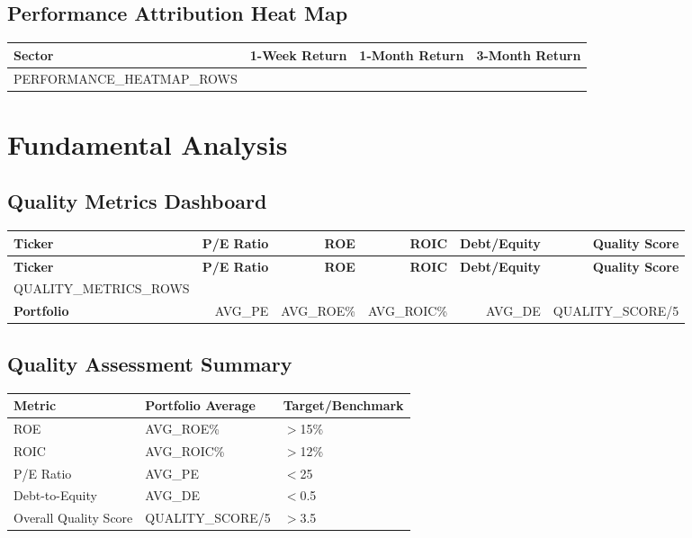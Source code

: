 \documentclass[11pt]{article}
\renewcommand{\arraystretch}{1.3}
\begin{document}
\subsection{Performance Attribution Heat Map}
\renewcommand{\arraystretch}{1.3}
\begin{tabularx}{\textwidth}{|X|>{\raggedleft\arraybackslash}X|>{\raggedleft\arraybackslash}X|>{\raggedleft\arraybackslash}X|}
\hline
\rowcolor{bearish!15}
\textbf{Sector} & \textbf{1-Week Return} & \textbf{1-Month Return} & \textbf{3-Month Return} \\
\hline
{{PERFORMANCE_HEATMAP_ROWS}}
\hline
\end{tabularx}

\section{Fundamental Analysis}

\subsection{Quality Metrics Dashboard}

\renewcommand{\arraystretch}{1.2}
\small  %
\begin{longtable}{|l|r|r|r|r|r|}
\hline
\rowcolor{primary!15}
\textbf{Ticker} & \textbf{P/E Ratio} & \textbf{ROE} & \textbf{ROIC} & \textbf{Debt/Equity} & \textbf{Quality Score} \\
\hline
\endfirsthead
\hline
\rowcolor{primary!15}
\textbf{Ticker} & \textbf{P/E Ratio} & \textbf{ROE} & \textbf{ROIC} & \textbf{Debt/Equity} & \textbf{Quality Score} \\
\hline
\endhead
{{QUALITY_METRICS_ROWS}}
\hline
\multicolumn{6}{|c|}{\textbf{Portfolio Weighted Averages}} \\
\hline
\textbf{Portfolio} & {{AVG_PE}} & {{AVG_ROE}}\% & {{AVG_ROIC}}\% & {{AVG_DE}} & {{QUALITY_SCORE}}/5 \\
\hline
\end{longtable}
\normalsize  %

\subsection{Quality Assessment Summary}

\begin{center}
\begin{tabularx}{\textwidth}{|X|X|X|}
\hline
\rowcolor{primary!20}
\textbf{Metric} & \textbf{Portfolio Average} & \textbf{Target/Benchmark} \\
\hline
ROE & {{AVG_ROE}}\% & $>$15\% \\
ROIC & {{AVG_ROIC}}\% & $>$12\% \\
P/E Ratio & {{AVG_PE}} & $<$25 \\
Debt-to-Equity & {{AVG_DE}} & $<$0.5 \\
Overall Quality Score & {{QUALITY_SCORE}}/5 & $>$3.5 \\
\hline
\end{tabularx}
\end{center}
\end{document}
